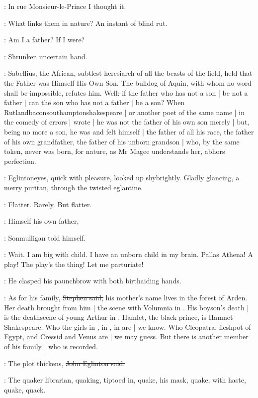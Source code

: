 \StephenInt:
In rue Monsieur-le-Prince
I thought it.

\Stephen:
What links them in nature?
An instant of blind rut.

\StephenInt:
Am I a father?
If I were?

\StephenInt:
Shrunken uncertain hand.

\Stephen:
Sabellius, the African,
subtlest heresiarch of all the beasts of the field,
held that the Father was Himself His Own Son.
The bulldog of Aquin,
with whom no word shall be impossible,
refutes him.
Well:
if the father who has not a son |
be not a father |
can the son who has not a father |
be a son?
When Rutlandbaconsouthamptonshakespeare |
or another poet of the same name |
in the comedy of errors |
wrote  |
he was not the father of his own son merely |
but, being no more a son,
he was and felt himself |
the father of all his race,
the father of his own grandfather,
the father of his unborn grandson |
who, by the same token,
never was born,
for nature,
as Mr Magee understands her,
abhors perfection.

:
Eglintoneyes,
quick with pleasure,
looked up shybrightly.
Gladly glancing,
a merry puritan,
through the twisted eglantine.

\StephenInt:
Flatter.
Rarely.
But flatter.

\mulligan:
Himself his own father,

:
Sonmulligan told himself.

\mulligan:
Wait.
I am big with child.
I have an unborn child in my brain.
Pallas Athena!
A play!
The play's the thing!
Let me parturiate!

:
He clasped his paunchbrow with both birthaiding hands.

\Stephen:
As for his family,
\sout{Stephen said,}
his mother's name lives in the forest of Arden.
Her death brought from him |
the scene with Volumnia in .
His boyson's death |
is the deathscene of young Arthur in .
Hamlet, the black prince,
is Hamnet Shakespeare.
Who the girls in ,
in ,
in  are |
we know.
Who Cleopatra,
fleshpot of Egypt,
and Cressid and Venus are |
we may guess.
But there is another member of his family |
who is recorded.

\eglinton:
The plot thickens,
\sout{John Eglinton said.}

:
The quaker librarian,
quaking,
tiptoed in,
quake,
his mask,
quake,
with haste,
quake,
quack.

